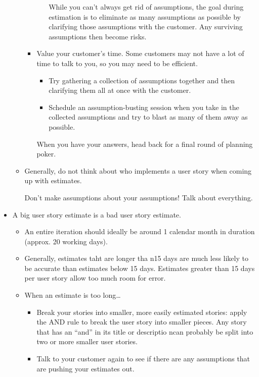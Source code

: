 \documentclass[letterpaper]{article}
\begin{document}
\begin{itemize}
\begin{itemize}
\begin{itemize}
\begin{itemize}
                \begin{mdframed}
                    While you can't always get rid of assumptions, the goal during estimation is to eliminate as many assumptions as possible by clarifying those assumptions with the customer. Any surviving assumptions then become risks. 
                \end{mdframed}
            \end{itemize}
            \item Value your customer's time. Some customers may not have a lot of time to talk to you, so you may need to be efficient. 
            \begin{itemize}
                \item Try gathering a collection of assumptions together and then clarifying them all at once with the customer. 
                \item Schedule an assumption-busting session when you take in the collected assumptions and try to blast as many of them away as possible. 
            \end{itemize}
            When you have your answers, head back for a final round of planning poker. 
        \end{itemize}
        \item Generally, do not think about who implements a user story when coming up with estimates. 
        \begin{mdframed}
            Don't make assumptions about your assumptions! Talk about everything. 
        \end{mdframed}
    \end{itemize}

    \item A big user story estimate is a bad user story estimate. 
    \begin{itemize}
        \item An entire iteration should ideally be around 1 calendar month in duration (approx. 20 working days). 
        \item Generally, estimates taht are longer tha n15 days are much less likely to be accurate than estimates below 15 days. Estimates greater than 15 days per user story allow too much room for error.
        \item When an estimate is too long\dots
        \begin{itemize}
            \item Break your stories into smaller, more easily estimated stories: apply the AND rule to break the user story into smaller pieces. Any story that has an ``and'' in its title or descriptio ncan probably be split into two or more smaller user stories. 
            \item Talk to your customer again to see if there are any assumptions that are pushing your estimates out.
        \end{itemize}
    \end{itemize}


\end{itemize}
\end{document}
